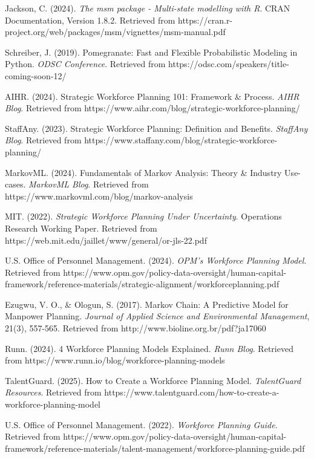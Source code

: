 \documentclass[main.tex]{subfiles}
\begin{document}
\begin{thebibliography}{99}
Jackson, C. (2024). \textit{The msm package - Multi-state modelling with R}. CRAN Documentation, Version 1.8.2. Retrieved from https://cran.r-project.org/web/packages/msm/vignettes/msm-manual.pdf

Schreiber, J. (2019). Pomegranate: Fast and Flexible Probabilistic Modeling in Python. \textit{ODSC Conference}. Retrieved from https://odsc.com/speakers/title-coming-soon-12/

AIHR. (2024). Strategic Workforce Planning 101: Framework \& Process. \textit{AIHR Blog}. Retrieved from https://www.aihr.com/blog/strategic-workforce-planning/

StaffAny. (2023). Strategic Workforce Planning: Definition and Benefits. \textit{StaffAny Blog}. Retrieved from https://www.staffany.com/blog/strategic-workforce-planning/

MarkovML. (2024). Fundamentals of Markov Analysis: Theory \& Industry Use-cases. \textit{MarkovML Blog}. Retrieved from https://www.markovml.com/blog/markov-analysis

MIT. (2022). \textit{Strategic Workforce Planning Under Uncertainty}. Operations Research Working Paper. Retrieved from https://web.mit.edu/jaillet/www/general/or-jls-22.pdf

U.S. Office of Personnel Management. (2024). \textit{OPM's Workforce Planning Model}. Retrieved from https://www.opm.gov/policy-data-oversight/human-capital-framework/reference-materials/strategic-alignment/workforceplanning.pdf

Ezugwu, V. O., \& Ologun, S. (2017). Markov Chain: A Predictive Model for Manpower Planning. \textit{Journal of Applied Science and Environmental Management}, 21(3), 557-565. Retrieved from http://www.bioline.org.br/pdf?ja17060

Runn. (2024). 4 Workforce Planning Models Explained. \textit{Runn Blog}. Retrieved from https://www.runn.io/blog/workforce-planning-models

TalentGuard. (2025). How to Create a Workforce Planning Model. \textit{TalentGuard Resources}. Retrieved from https://www.talentguard.com/how-to-create-a-workforce-planning-model

U.S. Office of Personnel Management. (2022). \textit{Workforce Planning Guide}. Retrieved from https://www.opm.gov/policy-data-oversight/human-capital-framework/reference-materials/talent-management/workforce-planning-guide.pdf

\end{thebibliography}
\end{document}
